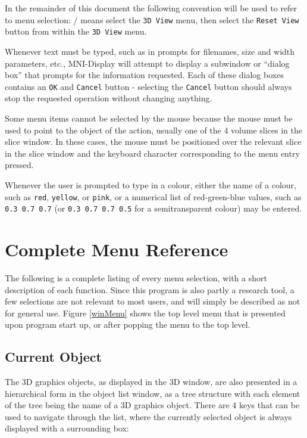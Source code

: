 \documentclass[11pt,letterpaper]{article}
\newcommand{\ident}[1]{{\tt #1}}
\newcommand{\display}{\mbox{MNI-Display}}
\newcommand{\menutwo}[2]{{\scriptsize \fbox{\bf #1}/\fbox{\bf #2}}}
\begin{document}
In the remainder of this document the following convention will be
used to refer to menu selection: \menutwo{3D View}{Reset View} means
select the \ident{3D View} menu, then select the \ident{Reset View}
button from within the \ident{3D View} menu.

Whenever text must be typed, such as in prompts for filenames, size
and width parameters, etc., \display{} will attempt to display a
subwindow or ``dialog box'' that prompts for the information
requested. Each of these dialog boxes contains an \ident{OK} and
\ident{Cancel} button - selecting the \ident{Cancel} button should
always stop the requested operation without changing anything.

Some menu items cannot be selected by the mouse because the mouse must
be used to point to the object of the action, usually one of the 4
volume slices in the slice window.  In these cases, the mouse must be
positioned over the relevant slice in the slice window and the
keyboard character corresponding to the menu entry pressed.

Whenever the user is prompted to type in a colour, either the name of
a colour, such as \ident{red}, \ident{yellow}, or \ident{pink}, or a
numerical list of red-green-blue values, such as \mbox{\ident{0.3 0.7 0.7}}
(or \mbox{\ident{0.3 0.7 0.7 0.5}} for a semitransparent colour) may
be entered.

\section{Complete Menu Reference}

The following is a complete listing of every menu selection, with a
short description of each function. Since this program is also partly
a research tool, a few selections are not relevant to most users, and
will simply be described as not for general use. Figure \ref{winMenu}
shows the top level menu that is presented upon program start up, or
after popping the menu to the top level.

\subsection{Current Object}

The 3D graphics objects, as displayed in the 3D window, are also
presented in a hierarchical form in the object list window, as a tree
structure with each element of the tree being the name of a 3D
graphics object. There are 4 keys that can be used to navigate through
the list, where the currently selected object is always displayed with
a surrounding box:
\end{document}
